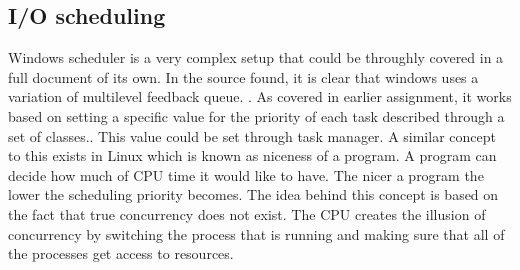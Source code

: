 \documentclass[journal,10pt,onecolumn,compsoc,letterpaper,draftclsnofoot,table,xcdraw]{IEEEtran} \usepackage[margin=0.75in]{geometry}
\begin{document}
\subsection{I/O scheduling}
\noindent Windows scheduler is a very complex setup that could be throughly covered in a full document of its own. In the source found, it is clear that windows uses a variation of multilevel feedback queue. \cite{8}. As covered in earlier assignment, it works based on setting a specific value for the priority of each task described through a set of classes.\cite{9}. This value could be set through task manager. A similar concept to this exists in Linux which is known as niceness of a program. A program can decide how much of CPU time it would like to have. The nicer a program the lower the scheduling priority becomes. The idea behind this concept is based on the fact that true concurrency does not exist. The CPU creates the illusion of concurrency by switching the process that is running and making sure that all of the processes get access to resources.
\end{document}
